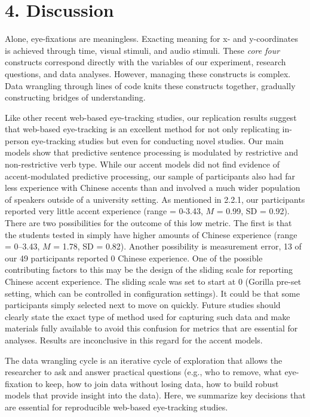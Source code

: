 \section{4. Discussion}
Alone, eye-fixations are meaningless. Exacting meaning for x- and y-coordinates is achieved
through time, visual stimuli, and audio stimuli. These \textit{core four} constructs correspond directly with the variables of our experiment, research questions, and data analyses. However, managing these constructs is complex. Data wrangling through lines of code knits these constructs together, gradually constructing bridges of understanding.

Like other recent web-based eye-tracking studies, our replication results suggest that web-based eye-tracking is an excellent method for not only replicating in-person eye-tracking studies \parencite{Vos_2017, Prystauka_Altmann_Rothman_2023} but even for conducting novel studies. Our main models show that predictive sentence processing is modulated by restrictive and non-restrictive verb type. While our accent models did not find evidence of accent-modulated predictive processing, our sample of participants also had far less experience with Chinese accents than \textcite{Porretta_et_al_2020} and involved a much wider population of speakers outside of a university setting. As mentioned in 2.2.1, our participants reported very little accent experience (range = 0-3.43, $M$ = 0.99, SD = 0.92). There are two possibilities for the outcome of this low metric. The first is that the students tested in \textcite{Porretta_et_al_2020} simply have higher amounts of Chinese experience (range = 0–3.43,
$M$ = 1.78, SD = 0.82). Another possibility is measurement error, 13 of our 49 participants reported 0 Chinese experience. One of the possible contributing factors to this may be the design of the sliding scale for reporting Chinese accent experience. The sliding scale was set to start at 0 (Gorilla pre-set setting, which can be controlled in configuration settings). It could be that some participants simply selected next to move on quickly. Future studies should clearly state the exact type of method used for capturing such data and make materials fully available to avoid this confusion for metrics that are essential for analyses. Results are inconclusive in this regard for the accent models. 

The data wrangling cycle is an iterative cycle of exploration that allows the researcher to ask and answer practical questions (e.g., who to remove, what eye-fixation to keep, how to join data without losing data, how to build robust models that provide insight into the data). Here, we summarize key decisions that are essential for reproducible web-based eye-tracking studies.

